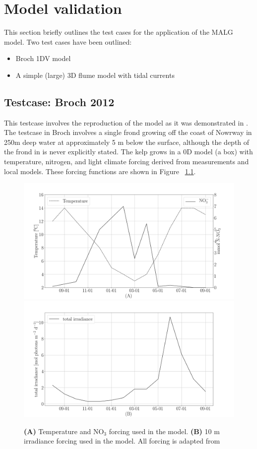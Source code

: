 \documentclass{deltares_manual}
\begin{document}
\pagebreak

\chapter{Model validation}
This section briefly outlines the test cases for the application of the MALG model. Two test cases have been outlined:
\begin{itemize}
	\item Broch 1DV model
	\item A simple (large) 3D flume model with tidal currents
\end{itemize}
\section{Testcase: Broch 2012}
This testcase involves the reproduction of the model as it was demonstrated in \cite{broch2012}. The testcase in Broch involves a single frond growing off the coast of Nowrway in 250m deep water at approximately 5 m below the surface, although the depth of the frond in \cite{broch2012} is never explicitly stated. The kelp grows in a 0D model (a box) with temperature, nitrogen, and light climate forcing derived from measurements and local models. These forcing functions are shown in Figure ~\ref{fig:forcing}.

\begin{figure}[H]
	\centering
	\includegraphics[width=1\linewidth]{figures/Temp_NO3}
	\includegraphics[width=1\linewidth]{figures/irradiance}
	\caption[]{\textbf{(A)} Temperature and NO$_{3}$ forcing used in the model. \textbf{(B)} 10 m irradiance forcing used in the model. All forcing is adapted from \cite{broch2012}}
	\label{fig:forcing}
\end{figure}
\end{document}
